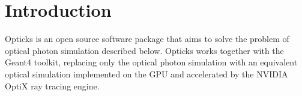 \documentclass[a4paper]{jpconf}
\begin{document}
%
%
%
%
%
%
%
%
%
%
  

\section{Introduction}

Opticks\cite{opticksURL} is an open source software package 
that aims to solve the problem of optical photon simulation described below.
Opticks works together with the Geant4\cite{g4A}\cite{g4B}\cite{g4C} toolkit, 
replacing only the optical photon simulation with an 
equivalent optical simulation implemented on the GPU and accelerated 
by the NVIDIA OptiX\cite{optixSite}\cite{optixPaper} ray tracing engine.
\end{document}
